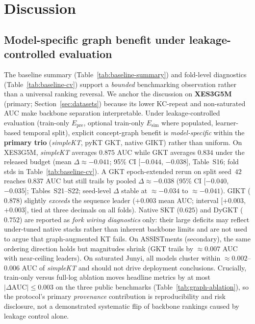 \documentclass[pdflatex,sn-mathphys-num]{sn-jnl}
\newcommand{\Epre}{\ensuremath{E_{\text{pre}}}}
\newcommand{\Esim}{\ensuremath{E_{\text{sim}}}}
\newcommand{\GKTdeltaci}{[$-0.044$, $-0.038$]}
\newcommand{\GKTthirtydeltavec}{-0.038}
\newcommand{\GKTthirtydeltaci}{[$-0.040$, $-0.035$]}
\newcommand{\GIKTdeltaci}{[$+0.003$, $+0.003$]}
\begin{document}
\section{Discussion}
\label{sec:disc}

\subsection{Model-specific graph benefit under leakage-controlled evaluation}
\label{sec:disc-model-specific}
The baseline summary (Table~\ref{tab:baseline-summary}) and fold-level
diagnostics (Table~\ref{tab:baseline-cv}) support a \emph{bounded}
benchmarking observation rather than a universal ranking reversal. We anchor
the discussion on \textbf{XES3G5M} (primary; Section~\ref{sec:datasets})
because its lower KC-repeat and non-saturated AUC make backbone separation
interpretable. Under leakage-controlled evaluation (train-only $\Epre$,
optional train-only $\Esim$ where populated, learner-based temporal split),
explicit concept-graph benefit is \emph{model-specific} within the
\textbf{primary trio} (\textit{simpleKT}, pyKT GKT, native GIKT) rather than
uniform. On XES3G5M, \textit{simpleKT} averages $0.875$ AUC while GKT averages
$0.834$ under the released budget (mean $\Delta{\approx}{-}0.041$; 95\% CI
\GKTdeltaci{}, Table~S16; fold stds in Table~\ref{tab:baseline-cv}). A
GKT epoch-extended rerun on split seed~$42$ reaches $0.837$ AUC but still
trails by pooled $\Delta{\approx}\GKTthirtydeltavec{}$ (95\% CI \GKTthirtydeltaci{};
Tables~S21--S22; seed-level $\Delta$ stable at ${\approx}{-}0.034$ to
${\approx}{-}0.041$). GIKT ($0.878$) slightly \emph{exceeds}
the sequence leader ($+0.003$ mean AUC; interval \GIKTdeltaci{}, tied at
three decimals on all folds). Native SKT ($0.625$)
and DyGKT ($0.752$) are reported as \emph{fork wiring diagnostics} only: their
large deficits may reflect under-tuned native stacks rather than inherent
backbone limits and are not used to argue that graph-augmented KT fails. On
ASSISTments (secondary), the same ordering direction holds but magnitudes shrink
(GKT trails by ${\approx}0.007$ AUC with near-ceiling leaders). On saturated
Junyi, all models cluster within ${\approx}0.002$--$0.006$ AUC of
\textit{simpleKT} and should not drive deployment conclusions. Crucially,
train-only versus full-log ablation moves headline metrics by at most
$|\Delta\text{AUC}|{\leq}0.003$ on the three public benchmarks
(Table~\ref{tab:graph-ablation}), so the protocol's primary \emph{provenance}
contribution is reproducibility and risk disclosure, not a demonstrated
systematic flip of backbone rankings caused by leakage control alone.
\end{document}
